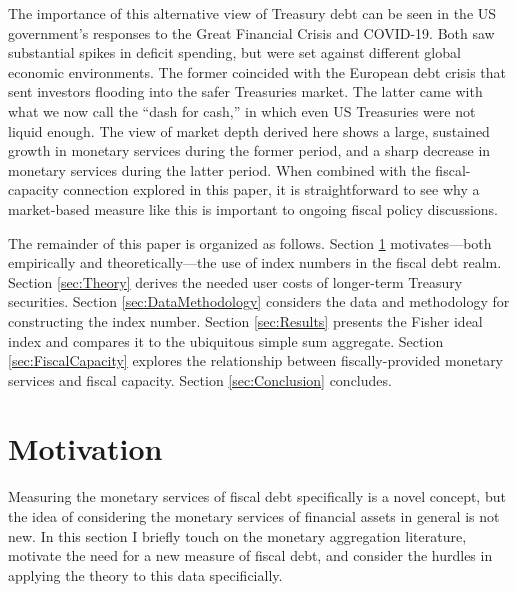 \documentclass[11pt,a4paper,margin=1.5in]{article}
\begin{document}
The importance of this alternative view of Treasury debt can be seen in the US government's responses to the Great Financial Crisis and COVID-19.
Both saw substantial spikes in deficit spending, but were set against different global economic environments.
The former coincided with the European debt crisis that sent investors flooding into the safer Treasuries market.
The latter came with what we now call the ``dash for cash,'' in which even US Treasuries were not liquid enough.
The view of market depth derived here shows a large, sustained growth in monetary services during the former period, and a sharp decrease in monetary services during the latter period.
When combined with the fiscal-capacity connection explored in this paper, it is straightforward to see why a market-based measure like this is important to ongoing fiscal policy discussions.


The remainder of this paper is organized as follows.
Section \ref{sec:Motivation} motivates---both empirically and theoretically---the use of index numbers in the fiscal debt realm.
Section \ref{sec:Theory} derives the needed user costs of longer-term Treasury securities.
Section \ref{sec:DataMethodology} considers the data and methodology for constructing the index number.
Section \ref{sec:Results} presents the Fisher ideal index and compares it to the ubiquitous simple sum aggregate.
Section \ref{sec:FiscalCapacity} explores the relationship between fiscally-provided monetary services and fiscal capacity.
Section \ref{sec:Conclusion} concludes.


\section{Motivation}
\label{sec:Motivation}
Measuring the monetary services of fiscal debt specifically is a novel concept, but the idea of considering the monetary services of financial assets in general is not new.
In this section I briefly touch on the monetary aggregation literature, motivate the need for a new measure of fiscal debt, and consider the hurdles in applying the theory to this data specificially. 
\end{document}
